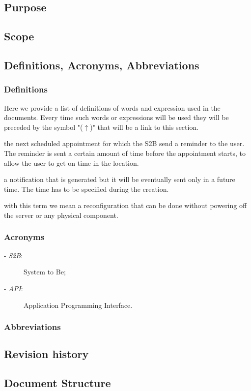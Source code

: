 \subsection{Purpose}
	
\subsection{Scope}
	
\subsection{Definitions, Acronyms, Abbreviations}
	\subsubsection{Definitions}
	\label{definitions}
	Here we provide a list of definitions of words and expression used in the documents. Every time such words or expressions will be used they will be preceded by the symbol "($\uparrow$)" that will be a link to this section.
	\begin{description}[before={\renewcommand{\makelabel}[1]{-- \textbf{\textit{##1}}:}}]
		\item[Incoming Appointment] the next scheduled appointment for which the S2B send a reminder to the user. The reminder is sent  a certain amount of time before the appointment starts, to allow the user to get on time in the location.
		\item[Future Notification] a notification that is generated but it will be eventually sent only in a future time. The time has to be specified during the creation.
		\item[Dynamic Configuration] with this term we mean a reconfiguration that can be done without powering off the server or any physical component.
	\end{description}
	\subsubsection{Acronyms}
			\begin{description}
		\item[- \textit{S2B}:] System to Be;
		\item[- \textit{API}:] Application Programming Interface.
	\end{description}
	\subsubsection{Abbreviations}
	
\subsection{Revision history}
	
\subsection{Document Structure}
